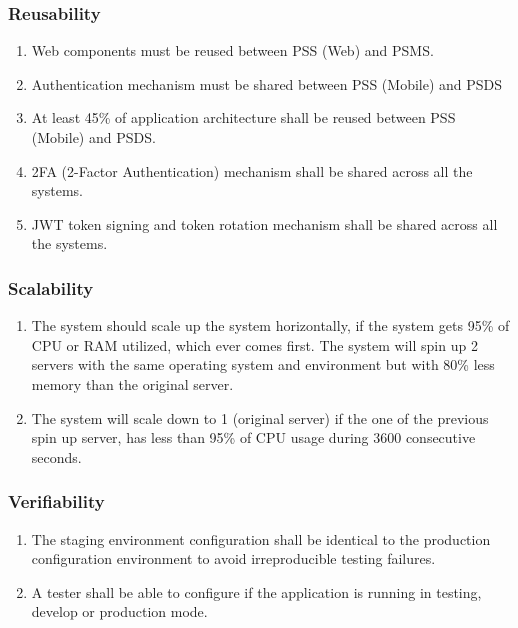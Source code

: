 \subsubsection{Reusability}
\begin{enumerate}[label=REU-\arabic*]
    \item Web components must be reused between PSS (Web) and PSMS.
    \item Authentication mechanism must be shared between PSS (Mobile) and PSDS
    \item At least 45\% of application architecture shall be reused 
    between PSS (Mobile) and PSDS.
    \item 2FA (2-Factor Authentication) mechanism shall be shared across 
    all the systems.
    \item JWT token signing and token rotation mechanism shall be shared 
    across all the systems.
\end{enumerate}

\subsubsection{Scalability}
\begin{enumerate}[label=SCA-\arabic*]
    \item The system should scale up the system horizontally, if the system 
    gets 95\% of CPU or RAM utilized, which ever comes first. The system will 
    spin up 2 servers with the same operating system and environment 
    but with 80\% less memory than the original server.
    \item The system will scale down to 1 (original server) if the one of the 
    previous spin up server, has less than 95\% of CPU usage during 3600 
    consecutive seconds.
\end{enumerate}
\subsubsection{Verifiability}
\begin{enumerate}[label=VER-\arabic*]
    \item The staging environment configuration shall be identical to the 
    production configuration environment to avoid irreproducible 
    testing failures.
    \item A tester shall be able to configure if the application is 
    running in testing, develop or production mode.
\end{enumerate}